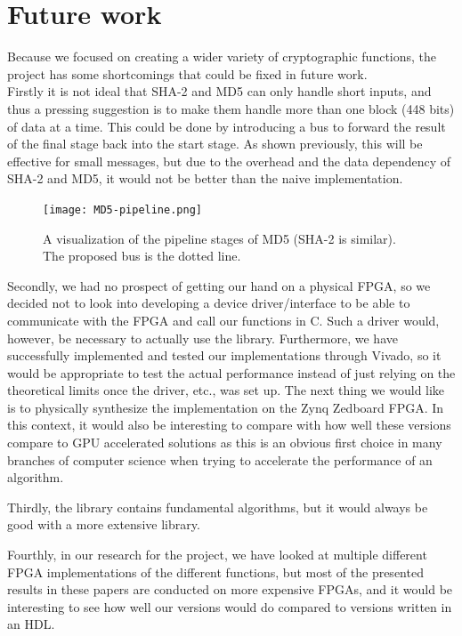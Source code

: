 \documentclass[a4paper, openany]{book}
\begin{document}
\section{Future work}
\label{sec:org7ddd6b0}
Because we focused on creating a wider variety of cryptographic functions, the project has some shortcomings that could be fixed in future work.\\

Firstly it is not ideal that SHA-2 and MD5 can only handle short inputs, and thus a pressing suggestion is to make them handle more than one block (448 bits) of data at a time. This could be done by introducing a bus to forward the result of the final stage back into the start stage. As shown previously, this will be effective for small messages, but due to the overhead and the data dependency of SHA-2 and MD5, it would not be better than the naive implementation.

\begin{figure}[H]
\centering
\captionsetup{width=.8\linewidth}
\texttt{[image: MD5-pipeline.png]}
\caption{A visualization of the pipeline stages of MD5 (SHA-2 is similar). The proposed bus is the dotted line.}
\label{fig:MD5-pipe}
\end{figure}

Secondly, we had no prospect of getting our hand on a physical FPGA, so we decided not to look into developing a device driver/interface to be able to communicate with the FPGA and call our functions in C. Such a driver would, however, be necessary to actually use the library. Furthermore, we have successfully implemented and tested our implementations through Vivado, so it would be appropriate to test the actual performance instead of just relying on the theoretical limits once the driver, etc., was set up. The next thing we would like is to physically synthesize the implementation on the Zynq Zedboard FPGA. In this context, it would also be interesting to compare with how well these versions compare to GPU accelerated solutions as this is an obvious first choice in many branches of computer science when trying to accelerate the performance of an algorithm.

Thirdly, the library contains fundamental algorithms, but it would always be good with a more extensive library.

Fourthly, in our research for the project, we have looked at multiple different FPGA implementations of the different functions, but most of the presented results in these papers are conducted on more expensive FPGAs, and it would be interesting to see how well our versions would do compared to versions written in an HDL.
\end{document}
